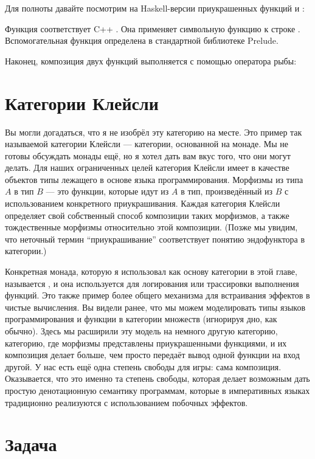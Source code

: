Для полноты давайте посмотрим на Haskell-версии приукрашенных
функций  и :

Функция  соответствует C++ . Она
применяет символьную функцию  к строке
. Вспомогательная функция  определена в
стандартной библиотеке Prelude.

Наконец, композиция двух функций выполняется с
помощью оператора рыбы:


\section{Категории Клейсли}

Вы могли догадаться, что я не изобрёл эту категорию на
месте. Это пример так называемой категории Клейсли --- категории,
основанной на монаде. Мы не готовы обсуждать монады ещё, но я хотел
дать вам вкус того, что они могут делать. Для наших ограниченных целей
категория Клейсли имеет в качестве объектов типы лежащего в основе
языка программирования. Морфизмы из типа $A$ в тип $B$ --- это функции, которые
идут из $A$ в тип, произведённый из $B$ с использованием конкретного приукрашивания.
Каждая категория Клейсли определяет свой собственный способ композиции таких морфизмов,
а также тождественные морфизмы относительно этой композиции.
(Позже мы увидим, что неточный термин ``приукрашивание'' соответствует
понятию эндофунктора в категории.)

Конкретная монада, которую я использовал как основу категории в этой
главе, называется , и она используется для логирования или
трассировки выполнения функций. Это также пример более
общего механизма для встраивания эффектов в чистые вычисления. Вы
видели ранее, что мы можем моделировать типы языков программирования и
функции в категории множеств (игнорируя дно, как обычно). Здесь
мы расширили эту модель на немного другую категорию, категорию,
где морфизмы представлены приукрашенными функциями, и их
композиция делает больше, чем просто передаёт вывод одной функции на
вход другой. У нас есть ещё одна степень свободы для игры:
сама композиция. Оказывается, что это именно та степень
свободы, которая делает возможным дать простую денотационную семантику
программам, которые в императивных языках традиционно реализуются
с использованием побочных эффектов.

\section{Задача}

